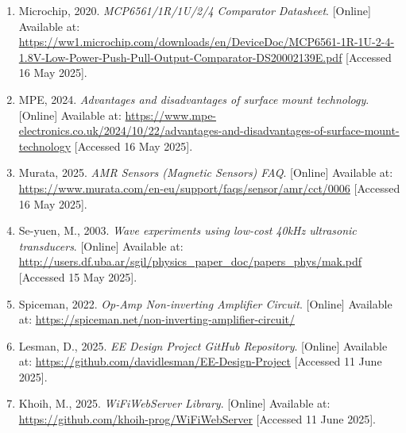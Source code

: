 \documentclass[12pt,a4paper]{report}
\begin{document}
\begin{enumerate}
    \item Microchip, 2020. \textit{MCP6561/1R/1U/2/4 Comparator Datasheet}. [Online]
          Available at: \url{https://ww1.microchip.com/downloads/en/DeviceDoc/MCP6561-1R-1U-2-4-1.8V-Low-Power-Push-Pull-Output-Comparator-DS20002139E.pdf}
          [Accessed 16 May 2025].

    \item MPE, 2024. \textit{Advantages and disadvantages of surface mount technology}. [Online]
          Available at: \url{https://www.mpe-electronics.co.uk/2024/10/22/advantages-and-disadvantages-of-surface-mount-technology}
          [Accessed 16 May 2025].

    \item Murata, 2025. \textit{AMR Sensors (Magnetic Sensors) FAQ}. [Online]
          Available at: \url{https://www.murata.com/en-eu/support/faqs/sensor/amr/cct/0006}
          [Accessed 16 May 2025].

    \item Se-yuen, M., 2003. \textit{Wave experiments using low-cost 40kHz ultrasonic transducers}. [Online]
          Available at: \url{http://users.df.uba.ar/sgil/physics_paper_doc/papers_phys/mak.pdf}
          [Accessed 15 May 2025].

    \item Spiceman, 2022. \textit{Op-Amp Non-inverting Amplifier Circuit}. [Online]
          Available at: \url{https://spiceman.net/non-inverting-amplifier-circuit/}

    \item Lesman, D., 2025. \textit{EE Design Project GitHub Repository}. [Online]
          Available at: \url{https://github.com/davidlesman/EE-Design-Project}
          [Accessed 11 June 2025].

    \item Khoih, M., 2025. \textit{WiFiWebServer Library}. [Online]
          Available at: \url{https://github.com/khoih-prog/WiFiWebServer}
          [Accessed 11 June 2025].

\end{enumerate}
\end{document}
